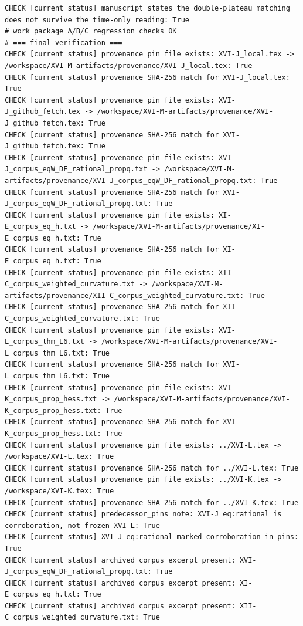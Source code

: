 \documentclass{article}
\theoremstyle{remark}
\begin{document}
\begin{lstlisting}
CHECK [current status] manuscript states the double-plateau matching does not survive the time-only reading: True
# work package A/B/C regression checks OK
# === final verification ===
CHECK [current status] provenance pin file exists: XVI-J_local.tex -> /workspace/XVI-M-artifacts/provenance/XVI-J_local.tex: True
CHECK [current status] provenance SHA-256 match for XVI-J_local.tex: True
CHECK [current status] provenance pin file exists: XVI-J_github_fetch.tex -> /workspace/XVI-M-artifacts/provenance/XVI-J_github_fetch.tex: True
CHECK [current status] provenance SHA-256 match for XVI-J_github_fetch.tex: True
CHECK [current status] provenance pin file exists: XVI-J_corpus_eqW_DF_rational_propq.txt -> /workspace/XVI-M-artifacts/provenance/XVI-J_corpus_eqW_DF_rational_propq.txt: True
CHECK [current status] provenance SHA-256 match for XVI-J_corpus_eqW_DF_rational_propq.txt: True
CHECK [current status] provenance pin file exists: XI-E_corpus_eq_h.txt -> /workspace/XVI-M-artifacts/provenance/XI-E_corpus_eq_h.txt: True
CHECK [current status] provenance SHA-256 match for XI-E_corpus_eq_h.txt: True
CHECK [current status] provenance pin file exists: XII-C_corpus_weighted_curvature.txt -> /workspace/XVI-M-artifacts/provenance/XII-C_corpus_weighted_curvature.txt: True
CHECK [current status] provenance SHA-256 match for XII-C_corpus_weighted_curvature.txt: True
CHECK [current status] provenance pin file exists: XVI-L_corpus_thm_L6.txt -> /workspace/XVI-M-artifacts/provenance/XVI-L_corpus_thm_L6.txt: True
CHECK [current status] provenance SHA-256 match for XVI-L_corpus_thm_L6.txt: True
CHECK [current status] provenance pin file exists: XVI-K_corpus_prop_hess.txt -> /workspace/XVI-M-artifacts/provenance/XVI-K_corpus_prop_hess.txt: True
CHECK [current status] provenance SHA-256 match for XVI-K_corpus_prop_hess.txt: True
CHECK [current status] provenance pin file exists: ../XVI-L.tex -> /workspace/XVI-L.tex: True
CHECK [current status] provenance SHA-256 match for ../XVI-L.tex: True
CHECK [current status] provenance pin file exists: ../XVI-K.tex -> /workspace/XVI-K.tex: True
CHECK [current status] provenance SHA-256 match for ../XVI-K.tex: True
CHECK [current status] predecessor_pins note: XVI-J eq:rational is corroboration, not frozen XVI-L: True
CHECK [current status] XVI-J eq:rational marked corroboration in pins: True
CHECK [current status] archived corpus excerpt present: XVI-J_corpus_eqW_DF_rational_propq.txt: True
CHECK [current status] archived corpus excerpt present: XI-E_corpus_eq_h.txt: True
CHECK [current status] archived corpus excerpt present: XII-C_corpus_weighted_curvature.txt: True

\end{lstlisting}
\end{document}
